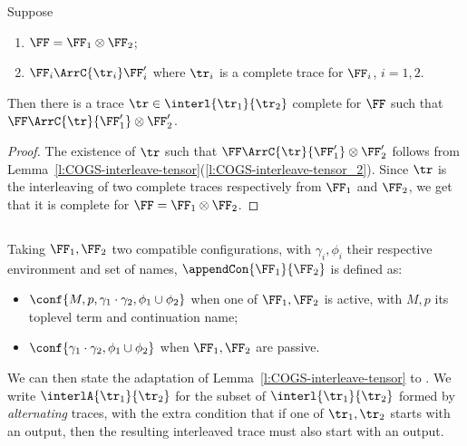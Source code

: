 \begin{lemma}
  \label{l:COGS-recomp-ct}
  Suppose 
  \begin{enumerate}
  \item $\FF = \FF_1 \otimes \FF_2$;   
  \item $\FF_i \ArrC{\tr_i} \FF_i'$ where 
  $\tr_i$ is a complete trace for $\FF_i$, %
   $i=1,2$. 
  \end{enumerate} 
  Then there is a trace 
   $\tr \in \interl{\tr_1}{\tr_2}$ complete for $\FF$ such that
  $\FF \ArrC{\tr}{\FF'_1} \otimes {\FF'_2}$. 
\end{lemma}

\begin{proof}
  The existence of $\tr$ such that $\FF \ArrC{\tr}{\FF'_1} \otimes {\FF'_2}$ follows from 
  Lemma~\ref{l:COGS-interleave-tensor}(\ref{l:COGS-interleave-tensor_2}). 
  Since $\tr$ is the interleaving of two complete traces respectively from 
  $\FF_1$ and $\FF_2$, we get that it is complete for $\FF = \FF_1 \otimes \FF_2$.
\end{proof} 

\subsection{\AOGS}
\label{a:tensor-aogs}

\begin{definition}
Taking $\FF_1,\FF_2$ two compatible \AOGS configurations, with 
 $\gamma_i,\phi_i$ their respective environment and set of names,
$\appendCon{\FF_1} {\FF_2}$ is defined as:
\begin{itemize}
 \item $\conf{M,p,\gamma_1 \cdot \gamma_2,\phi_1 \cup \phi_2}$
 when one of $\FF_1,\FF_2$  is active, with $M,p$ its toplevel term and continuation name;
 \item $\conf{\gamma_1 \cdot \gamma_2,\phi_1 \cup \phi_2}$
 when $\FF_1,\FF_2$  are passive.
\end{itemize}
\end{definition}
\noindent
We can then state the adaptation of Lemma~\ref{l:COGS-interleave-tensor} to \AOGS.
We write $\interlA{\tr_1}{\tr_2}$ for the subset of $\interl{\tr_1}{\tr_2}$
formed by \emph{alternating} traces, with the
extra condition that if one of $\tr_1,\tr_2$
starts with an output, then the resulting interleaved trace must also start with an output.

